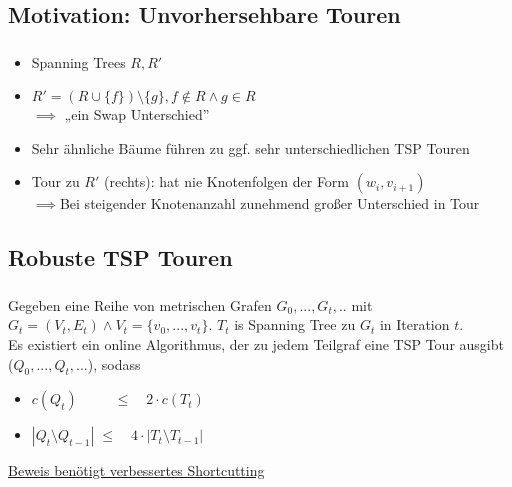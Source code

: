 \subsection{Motivation: Unvorhersehbare Touren}
\begin{frame}
    \frametitle{\insertsubsection}
    \begin{itemize}
        \itemsep\setlength{0.8em}
        \item Spanning Trees $R, R'$
        \item $R' = (R \cup \{f\}) \setminus \{g\}, f \notin R \wedge g \in R$\\$\implies$ „ein Swap Unterschied”
        \vspace{1em}
        \item Sehr ähnliche Bäume führen zu ggf. sehr unterschiedlichen TSP Touren
        \item Tour zu $R'$ (rechts): hat nie Knotenfolgen der Form $(w_i, v_{i+1})$\\$\implies$Bei steigender Knotenanzahl zunehmend großer Unterschied in Tour
    \end{itemize}
\end{frame}

\subsection{Robuste TSP Touren}

\begin{frame}
    \frametitle{\insertsubsection}
    \begin{theorem}
        \vspace{.8em}
        Gegeben eine Reihe von metrischen Grafen $G_0, ..., G_t,..$ mit $G_t = (V_t, E_t) \wedge V_t = \{v_0, ...,v_t\}$. $T_t$ is Spanning Tree zu $G_t$ in Iteration $t$.\\
        \vspace{1em}
        Es existiert ein online Algorithmus, der zu jedem Teilgraf eine TSP Tour ausgibt ($Q_0, ..., Q_t, ...$), sodass
        \vspace{.7em}
        \begin{itemize}
            \label{thm3}
            \itemsep\setlength{0.7em}
            \item $c(Q_t) \qquad \;\; \leq \quad 2 \cdot c(T_t)$
            \item $|Q_t \setminus Q_{t-1}| \; \leq \quad 4 \cdot |T_t \setminus T_{t-1}|$
        \end{itemize}
        \vspace{.8em}
    \end{theorem}
    \vspace{1em}
    \underline{Beweis benötigt verbessertes Shortcutting}
\end{frame}


